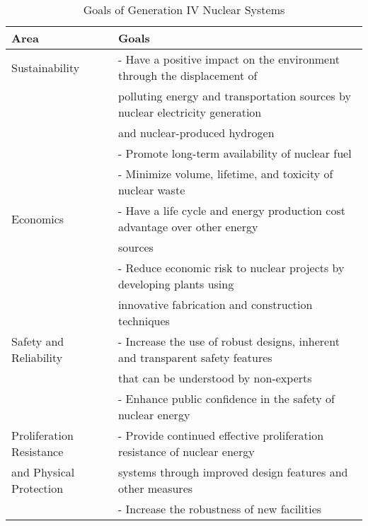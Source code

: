 \begin{table}[]
    \centering
    \onehalfspacing
    \caption{Goals of Generation IV Nuclear Systems \cite{gif_technology_2002,
    behar_technology_2014}}
	\label{tab:goals-gen4}
    \small
    \begin{tabular}{l|l}
    \hline
                               \textbf{Area} & \textbf{Goals} \\ \hline
    Sustainability   & - Have a positive impact on the environment through the displacement of \\
    & polluting energy and transportation sources by nuclear electricity generation \\
    & and nuclear-produced hydrogen \\ 
    & - Promote long-term availability of nuclear fuel \\
    & - Minimize volume, lifetime, and toxicity of nuclear waste \\ \hline
    Economics & - Have a life cycle and energy production cost advantage over other energy \\
    & sources \\ 
    & - Reduce economic risk to nuclear projects by developing plants using \\
    & innovative fabrication and construction techniques \\ \hline
    Safety and Reliability   & - Increase the use of robust designs, inherent and transparent safety features\\
    & that can be understood by non-experts \\ 
    & - Enhance public confidence in the safety of nuclear energy \\\hline
    Proliferation Resistance & - Provide continued effective proliferation resistance of nuclear energy \\
    and Physical Protection & systems through improved design features and other measures \\ 
    & - Increase the robustness of new facilities \\ \hline
    \end{tabular}
    \end{table}

